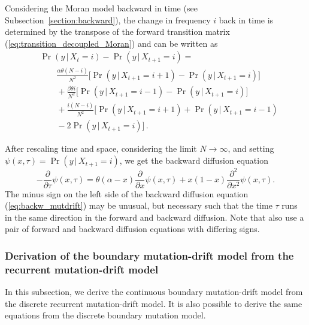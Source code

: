 \documentclass[preprint]{elsarticle}
\newcommand\given{{\,|\,}}
\newcommand\x[1]{\ensuremath{X_{#1}}}
\begin{document}
Considering the Moran model backward in time (see Subsection~\ref{section:backward}), the change in frequency $i$ back in time is determined by the transpose of the forward transition matrix (\ref{eq:transition_decoupled_Moran}) and can be written as
\begin{equation}\label{eq:back_discr_mutation}
\begin{split}
&\Pr(y \given\x{t}=i)-\Pr(y\given\x{t+1}=i) = \\
&\qquad \frac{\alpha \theta (N-i)}{N^2} \bigg[\Pr(y\given\x{t+1}=i+1)-\Pr(y\given\x{t+1}=i)\bigg]\\
&\qquad+ \frac{\beta \theta i}{N^2} \bigg[\Pr(y\given\x{t+1}=i-1)-\Pr(y\given\x{t+1}=i)\bigg]\\
&\qquad+ \frac{i(N-i)}{N^2} \bigg[\Pr(y\given\x{t+1}=i+1)+\Pr(y\given\x{t+1}=i-1)\\
&\qquad-2\Pr(y\given\x{t+1}=i)\bigg]\,.
\end{split}
\end{equation}

After rescaling time and space, considering the limit $N \to \infty$, and setting $\psi(x,\tau)=\Pr(y\given \x{t+1}=i)$, we get the backward diffusion equation
\begin{equation}\label{eq:backw_mutdrift}
-\frac{\partial}{\partial \tau} \psi(x,\tau) =
    \theta(\alpha-x)\frac{\partial}{\partial x} \psi(x,\tau) +x(1-x)\frac{\partial^2}{\partial x^2}\psi(x,\tau).
\end{equation}
The minus sign on the left side of the backward diffusion equation (\ref{eq:backw_mutdrift}) may be unusual, but necessary such that the time $\tau$ runs in the same direction in the forward and backward diffusion. Note that \citet{Zhao13a} also use a pair of forward and backward diffusion equations with differing signs.


\subsubsection{Derivation of the boundary mutation-drift model from the recurrent mutation-drift model}\label{section:backward_derivation}

In this subsection, we derive the continuous boundary mutation-drift model from the discrete recurrent mutation-drift model. It is also possible to derive the same equations from the discrete boundary mutation model.
\end{document}

